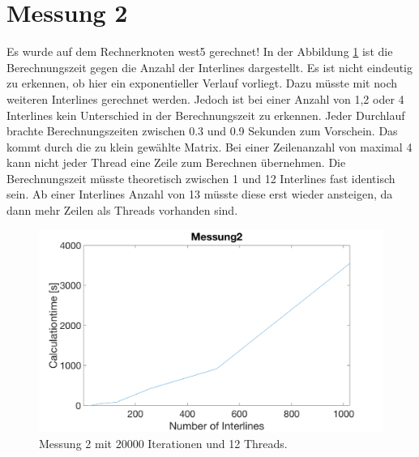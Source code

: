 \documentclass[11pt,a4paper]{article}
\begin{document}
\section{Messung 2}
Es wurde auf dem Rechnerknoten west5 gerechnet!
In der Abbildung \ref{messung2} ist die Berechnungszeit gegen die Anzahl der Interlines dargestellt. Es ist nicht eindeutig zu erkennen, ob hier ein exponentieller Verlauf vorliegt. Dazu müsste mit noch weiteren Interlines gerechnet werden. Jedoch ist bei einer Anzahl von 1,2 oder 4 Interlines kein Unterschied in der Berechnungszeit zu erkennen. Jeder Durchlauf brachte Berechnungszeiten zwischen 0.3 und 0.9 Sekunden zum Vorschein. Das kommt durch die zu klein gewählte Matrix. Bei einer Zeilenanzahl von maximal 4 kann nicht jeder Thread eine Zeile zum Berechnen übernehmen. Die Berechnungszeit müsste theoretisch zwischen 1 und 12 Interlines fast identisch sein. Ab einer Interlines Anzahl von 13 müsste diese erst wieder ansteigen, da dann mehr Zeilen als Threads vorhanden sind. 

\begin{figure}[htb]
\centering
\includegraphics[width=1.0\textwidth,angle=0]{Messung2.png}
\caption{Messung 2 mit 20000 Iterationen und 12 Threads.}
\label{messung2}
\end{figure}
\end{document}
